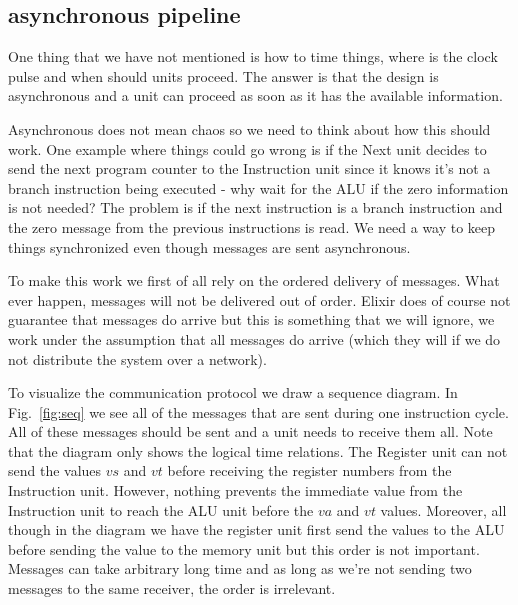 \documentclass[a4paper,11pt]{article}
\begin{document}
\subsection*{asynchronous pipeline}

One thing that we have not mentioned is how to time things, where is
the clock pulse and when should units proceed. The answer is that the
design is asynchronous and a unit can proceed as soon as it has the
available information.

Asynchronous does not mean chaos so we need to think about how this
should work. One example where things could go wrong is if the Next
unit decides to send the next program counter to the Instruction unit
since it knows it's not a branch instruction being executed - why wait
for the ALU if the zero information is not needed? The problem is if
the next instruction is a branch instruction and the zero message from
the previous instructions is read. We need a way to keep things
synchronized even though messages are sent asynchronous. 

To make this work we first of all rely on the ordered delivery of
messages. What ever happen, messages will not be delivered out of
order. Elixir does of course not guarantee that messages do arrive but
this is something that we will ignore, we work under the assumption
that all messages do arrive (which they will if we do not distribute
the system over a network).

To visualize the communication protocol we draw a sequence diagram. In
Fig.~\ref{fig:seq} we see all of the messages that are sent during one
instruction cycle. All of these messages should be sent and a unit
needs to receive them all. Note that the diagram only shows the
logical time relations. The Register unit can not send the values $vs$
and $vt$ before receiving the register numbers from the Instruction
unit. However, nothing prevents the immediate value from the
Instruction unit to reach the ALU unit before the $va$ and $vt$
values. Moreover, all though in the diagram we have the register unit
first send the values to the ALU before sending the value to the
memory unit but this order is not important. Messages can take
arbitrary long time and as long as we're not sending two messages to
the same receiver, the order is irrelevant. 
\end{document}
